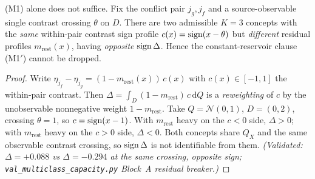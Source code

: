 \begin{lemma}\label{lem:mc-residual-nec}
(M1) alone does not suffice. Fix the conflict pair $j_g,j_f$ and a source-observable
single contrast crossing $\theta$ on $D$. There are two admissible $K=3$ concepts with the
\emph{same} within-pair contrast sign profile $c(x)=\operatorname{sign}(x-\theta)$ but \emph{different}
residual profiles $m_{\mathrm{rest}}(x)$, having \emph{opposite} $\operatorname{sign}\Delta$. Hence the
constant-reservoir clause (M1$'$) cannot be dropped.
\end{lemma}
\begin{proof}
Write $\eta_{j_f}-\eta_{j_g}=(1-m_{\mathrm{rest}}(x))\,c(x)$ with $c(x)\in[-1,1]$ the
within-pair contrast. Then $\Delta=\int_D(1-m_{\mathrm{rest}})\,c\,\mathrm dQ$ is a
\emph{reweighting} of $c$ by the unobservable nonnegative weight $1-m_{\mathrm{rest}}$. Take
$Q=\mathcal N(0,1)$, $D=(0,2)$, crossing $\theta=1$, so $c=\operatorname{sign}(x-1)$. With
$m_{\mathrm{rest}}$ heavy on the $c<0$ side, $\Delta>0$; with $m_{\mathrm{rest}}$ heavy on
the $c>0$ side, $\Delta<0$. Both concepts share $Q_X$ and the same observable contrast
crossing, so $\operatorname{sign}\Delta$ is not identifiable from them.
\emph{(Validated: $\Delta=+0.088$ vs $\Delta=-0.294$ at the same crossing, opposite sign;
\texttt{val\_multiclass\_capacity.py} Block~A residual breaker.)}
\end{proof}

